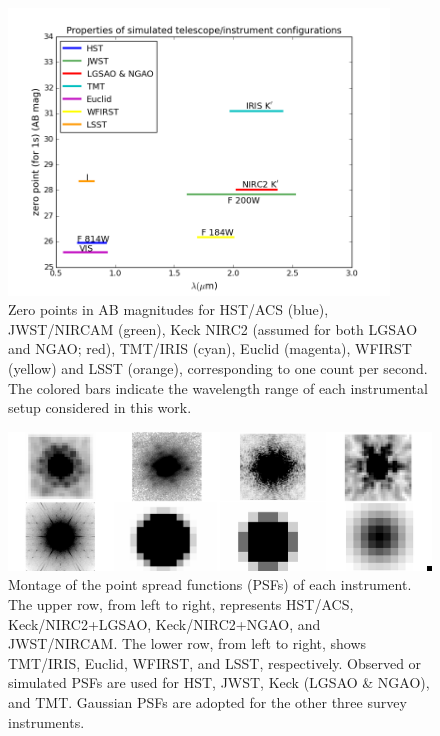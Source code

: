 \documentclass[a4paper,11pt]{article}
\begin{document}
{%
\begin{figure}
\begin{center}
\includegraphics[width=0.9\textwidth]{figures/wavelength_zp.png}
\end{center}
\caption{Zero points in AB magnitudes for HST/ACS (blue), JWST/NIRCAM (green), Keck NIRC2  (assumed for both LGSAO and NGAO; red), TMT/IRIS (cyan), Euclid (magenta), WFIRST (yellow) and LSST (orange), corresponding to one count per second. The colored bars indicate the wavelength range of each instrumental setup considered in this work.}
\label{fig:zp_wavelength}
\end{figure}


\begin{figure}
\begin{center}
\includegraphics[width=1.0\textwidth]{figures/PSF_montage.png}
\end{center}
\caption{Montage of the point spread functions (PSFs) of each instrument. The upper row, from left to right, represents HST/ACS, Keck/NIRC2+LGSAO, Keck/NIRC2+NGAO, and JWST/NIRCAM. The lower row, from left to right, shows TMT/IRIS, Euclid, WFIRST, and LSST, respectively. Observed or simulated PSFs are used for HST, JWST, Keck (LGSAO \& NGAO), and TMT. Gaussian PSFs are adopted for the other three survey instruments.}
\label{fig:PSF_montage}
\end{figure}



}
\end{document}
